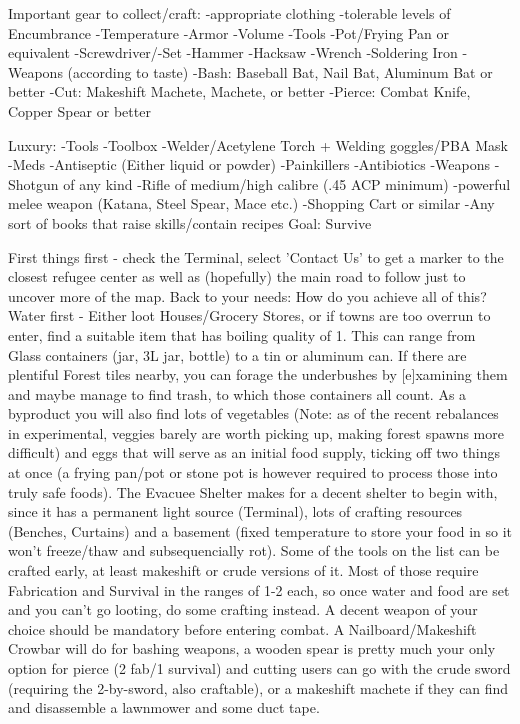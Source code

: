\documentclass[11pt]{report}
\begin{document}
Important gear to collect/craft:
-appropriate clothing
	-tolerable levels of Encumbrance
-Temperature
-Armor
-Volume
-Tools
	-Pot/Frying Pan or equivalent
-Screwdriver/-Set
-Hammer
-Hacksaw
-Wrench
-Soldering Iron
-Weapons (according to taste)
	-Bash: Baseball Bat, Nail Bat, Aluminum Bat or better
	-Cut: Makeshift Machete, Machete, or better
	-Pierce: Combat Knife, Copper Spear or better

Luxury:
-Tools
	-Toolbox
	-Welder/Acetylene Torch + Welding goggles/PBA Mask
-Meds
	-Antiseptic (Either liquid or powder)
	-Painkillers
	-Antibiotics
-Weapons
	-Shotgun of any kind
	-Rifle of medium/high calibre (.45 ACP minimum)
	-powerful melee weapon (Katana, Steel Spear, Mace etc.)
-Shopping Cart or similar
-Any sort of books that raise skills/contain recipes
Goal: Survive

First things first - check the Terminal, select 'Contact Us' to get a marker to the closest refugee center as well as (hopefully) the main road to follow just to uncover more of the map. Back to your needs:
How do you achieve all of this? Water first - Either loot Houses/Grocery Stores, or if towns are too overrun to enter, find a suitable item that has boiling quality of 1. This can range from Glass containers (jar, 3L jar, bottle) to a tin or aluminum can. If there are plentiful Forest tiles nearby, you can forage the underbushes by [e]xamining them and maybe manage to find trash, to which those containers all count. As a byproduct you will also find lots of vegetables (Note: as of the recent rebalances in experimental, veggies barely are worth picking up, making forest spawns more difficult) and eggs that will serve as an initial food supply, ticking off two things at once (a frying pan/pot or stone pot is however required to process those into truly safe foods).
The Evacuee Shelter makes for a decent shelter to begin with, since it has a permanent light source (Terminal), lots of crafting resources (Benches, Curtains) and a basement (fixed temperature to store your food in so it won't freeze/thaw and subsequencially rot).
Some of the tools on the list can be crafted early, at least makeshift or crude versions of it. Most of those require Fabrication and Survival in the ranges of 1-2 each, so once water and food are set and you can't go looting, do some crafting instead.
A decent weapon of your choice should be mandatory before entering combat. A Nailboard/Makeshift Crowbar will do for bashing weapons, a wooden spear is pretty much your only option for pierce (2 fab/1 survival) and cutting users can go with the crude sword (requiring the 2-by-sword, also craftable), or a makeshift machete if they can find and disassemble a lawnmower and some duct tape.
\end{document}
